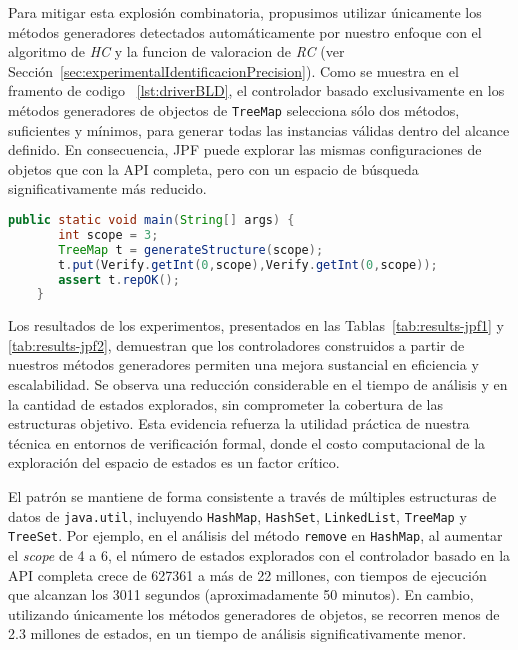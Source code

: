 Para mitigar esta explosión combinatoria, propusimos utilizar únicamente los métodos generadores 
detectados automáticamente por nuestro enfoque con el algoritmo de \emph{HC} y la funcion de valoracion de \emph{RC} (ver Sección~\ref{sec:experimentalIdentificacionPrecision}). 
Como se muestra en el framento de codigo ~\ref{lst:driverBLD}, el controlador basado exclusivamente en los métodos generadores de objectos de 
\texttt{TreeMap} selecciona sólo dos métodos, suficientes y mínimos, para generar todas las instancias 
válidas dentro del alcance definido. En consecuencia, JPF puede explorar las mismas configuraciones 
de objetos que con la API completa, pero con un espacio de búsqueda significativamente más reducido.

\begin{lstlisting}[caption={Probando el método put de TreeMap con JPF},label={lst:label},language=Java,captionpos=b]
    public static void main(String[] args) {
       int scope = 3;
       TreeMap t = generateStructure(scope);
       t.put(Verify.getInt(0,scope),Verify.getInt(0,scope));
       assert t.repOK();
    }
\end{lstlisting}

Los resultados de los experimentos, presentados en las Tablas~\ref{tab:results-jpf1} y 
\ref{tab:results-jpf2}, demuestran que los controladores construidos a partir de nuestros 
métodos generadores permiten una mejora sustancial en eficiencia y escalabilidad. Se observa una 
reducción considerable en el tiempo de análisis y en la cantidad de estados explorados, sin 
comprometer la cobertura de las estructuras objetivo. Esta evidencia refuerza la utilidad práctica 
de nuestra técnica en entornos de verificación formal, donde el costo computacional de la exploración 
del espacio de estados es un factor crítico.

El patrón se mantiene de forma consistente a través de múltiples estructuras de datos de 
\texttt{java.util}, incluyendo \texttt{HashMap}, \texttt{HashSet}, \texttt{LinkedList}, 
\texttt{TreeMap} y \texttt{TreeSet}. Por ejemplo, en el análisis del método \texttt{remove} 
en \texttt{HashMap}, al aumentar el \textit{scope} de 4 a 6, el número de estados explorados 
con el controlador basado en la API completa crece de 627361 a más de 22 millones, con tiempos 
de ejecución que alcanzan los 3011 segundos (aproximadamente 50 minutos). En cambio, utilizando únicamente los métodos generadores de objetos, 
se recorren menos de 2.3 millones de estados, en un tiempo de análisis significativamente menor.

